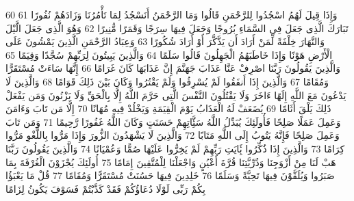 \documentclass[20pt,a4paper]{article}
\begin{document}
{\tiny\colorbox{cl_aya}{60}} وَإِذَا قِيلَ لَهُمُ اسْجُدُوا لِلرَّحْمَنِ قَالُوا وَمَا الرَّحْمَنُ أَنَسْجُدُ لِمَا تَأْمُرُنَا وَزَادَهُمْ نُفُورًا
{\tiny\colorbox{cl_aya}{61}} تَبَارَكَ الَّذِى جَعَلَ فِى السَّمَاءِ بُرُوجًا وَجَعَلَ فِيهَا سِرَجًا وَقَمَرًا مُّنِيرًا
{\tiny\colorbox{cl_aya}{62}} وَهُوَ الَّذِى جَعَلَ الَّيْلَ وَالنَّهَارَ خِلْفَةً لِّمَنْ أَرَادَ أَن يَذَّكَّرَ أَوْ أَرَادَ شُكُورًا
{\tiny\colorbox{cl_aya}{63}} وَعِبَادُ الرَّحْمَنِ الَّذِينَ يَمْشُونَ عَلَى الْأَرْضِ هَوْنًا وَإِذَا خَاطَبَهُمُ الْجَهِلُونَ قَالُوا سَلَمًا
{\tiny\colorbox{cl_aya}{64}} وَالَّذِينَ يَبِيتُونَ لِرَبِّهِمْ سُجَّدًا وَقِيَمًا
{\tiny\colorbox{cl_aya}{65}} وَالَّذِينَ يَقُولُونَ رَبَّنَا اصْرِفْ عَنَّا عَذَابَ جَهَنَّمَ إِنَّ عَذَابَهَا كَانَ غَرَامًا
{\tiny\colorbox{cl_aya}{66}} إِنَّهَا سَاءَتْ مُسْتَقَرًّا وَمُقَامًا
{\tiny\colorbox{cl_aya}{67}} وَالَّذِينَ إِذَا أَنفَقُوا لَمْ يُسْرِفُوا وَلَمْ يَقْتُرُوا وَكَانَ بَيْنَ ذَلِكَ قَوَامًا
{\tiny\colorbox{cl_aya}{68}} وَالَّذِينَ لَا يَدْعُونَ مَعَ اللَّهِ إِلَهًا ءَاخَرَ وَلَا يَقْتُلُونَ النَّفْسَ الَّتِى حَرَّمَ اللَّهُ إِلَّا بِالْحَقِّ وَلَا يَزْنُونَ وَمَن يَفْعَلْ ذَلِكَ يَلْقَ أَثَامًا
{\tiny\colorbox{cl_aya}{69}} يُضَعَفْ لَهُ الْعَذَابُ يَوْمَ الْقِيَمَةِ وَيَخْلُدْ فِيهِ مُهَانًا
{\tiny\colorbox{cl_aya}{70}} إِلَّا مَن تَابَ وَءَامَنَ وَعَمِلَ عَمَلًا صَلِحًا فَأُولَئِكَ يُبَدِّلُ اللَّهُ سَئَِّاتِهِمْ حَسَنَتٍ وَكَانَ اللَّهُ غَفُورًا رَّحِيمًا
{\tiny\colorbox{cl_aya}{71}} وَمَن تَابَ وَعَمِلَ صَلِحًا فَإِنَّهُ يَتُوبُ إِلَى اللَّهِ مَتَابًا
{\tiny\colorbox{cl_aya}{72}} وَالَّذِينَ لَا يَشْهَدُونَ الزُّورَ وَإِذَا مَرُّوا بِاللَّغْوِ مَرُّوا كِرَامًا
{\tiny\colorbox{cl_aya}{73}} وَالَّذِينَ إِذَا ذُكِّرُوا بَِٔايَتِ رَبِّهِمْ لَمْ يَخِرُّوا عَلَيْهَا صُمًّا وَعُمْيَانًا
{\tiny\colorbox{cl_aya}{74}} وَالَّذِينَ يَقُولُونَ رَبَّنَا هَبْ لَنَا مِنْ أَزْوَجِنَا وَذُرِّيَّتِنَا قُرَّةَ أَعْيُنٍ وَاجْعَلْنَا لِلْمُتَّقِينَ إِمَامًا
{\tiny\colorbox{cl_aya}{75}} أُولَئِكَ يُجْزَوْنَ الْغُرْفَةَ بِمَا صَبَرُوا وَيُلَقَّوْنَ فِيهَا تَحِيَّةً وَسَلَمًا
{\tiny\colorbox{cl_aya}{76}} خَلِدِينَ فِيهَا حَسُنَتْ مُسْتَقَرًّا وَمُقَامًا
{\tiny\colorbox{cl_aya}{77}} قُلْ مَا يَعْبَؤُا بِكُمْ رَبِّى لَوْلَا دُعَاؤُكُمْ فَقَدْ كَذَّبْتُمْ فَسَوْفَ يَكُونُ لِزَامًا
\end{document}
